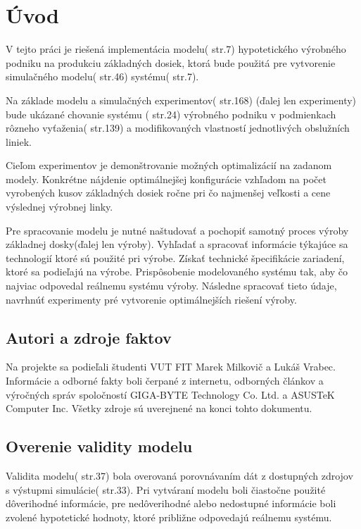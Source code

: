 \documentclass[12pt,a4paper,titlepage,final]{article}
\begin{document}
\newpage
\pagestyle{plain}
\setcounter{page}{1}

\section{Úvod}
V tejto práci je riešená implementácia modelu(\cite{peringer-slidy} str.7) hypotetického
výrobného podniku na produkciu základných dosiek, ktorá bude použitá pre 
vytvorenie simulačného modelu(\cite{peringer-slidy} str.46) systému(\cite{peringer-slidy} str.7).

Na základe modelu a simulačných experimentov(\cite{peringer-slidy} str.168)
(ďalej len experimenty) bude ukázané chovanie systému (\cite{peringer-slidy} str.24)
výrobného podniku v podmienkach rôzneho vyťaženia(\cite{peringer-slidy} str.139) a
modifikovaných vlastností jednotlivých obslužních liniek.
 

Cieľom experimentov je demonštrovanie možných optimalizácií na zadanom modely. Kon\-kré\-tne
nájdenie optimálnejšej konfigurácie vzhľadom na počet vyrobených
kusov základných dosiek ročne pri čo najmenšej veľkosti a cene výslednej 
výrobnej linky.

Pre spracovanie modelu je nutné naštudovať a pochopiť samotný proces výroby
základnej dosky(ďalej len výroby). Vyhľadať a spracovať informácie týkajúce sa 
technologií ktoré sú použité pri výrobe. Získať technické špecifikácie zariadení,
ktoré sa podieľajú na výrobe. Pri\-spô\-so\-be\-nie modelovaného systému tak,
aby čo najviac odpovedal reálnemu
systému výroby. Následne spracovať tieto údaje, navrhnúť experimenty pré 
vytvorenie optimálnejších riešení výroby. 

\subsection{Autori a zdroje faktov}
Na projekte sa podieľali študenti VUT FIT Marek Milkovič a Lukáš Vrabec. Informácie
a odborné fakty boli čerpané z internetu, odborných článkov a výročných
správ spoločností GIGA-BYTE Technology Co. Ltd. a ASUSTeK Computer Inc.
Všetky zdroje sú uverejnené na konci tohto dokumentu.

\subsection{Overenie validity modelu}
Validita modelu(\cite{peringer-slidy} str.37) bola overovaná porovnávaním dát z
dostupných zdrojov s výstupmi simulácie(\cite{peringer-slidy} str.33). Pri vytváraní
modelu boli čiastočne  použité dôverihodné informácie, pre nedôverihodné alebo
nedostupné informácie boli zvolené hypotetické hodnoty, ktoré približne odpovedajú reálnemu systému. 
\end{document}
